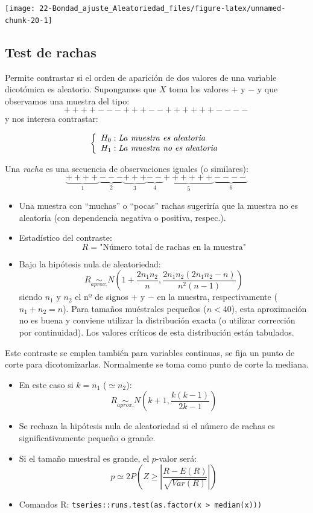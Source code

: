 \documentclass[
]{book}
\theoremstyle{break}
\theoremstyle{definition}
\theoremstyle{definition}
\theoremstyle{definition}
\theoremstyle{remark}
\begin{document}
\begin{center}\texttt{[image: 22-Bondad\_ajuste\_Aleatoriedad\_files/figure-latex/unnamed-chunk-20-1]} \end{center}

\hypertarget{test-de-rachas}{%
\subsection{Test de rachas}\label{test-de-rachas}}

Permite contrastar si el orden de aparición de dos valores de una
variable dicotómica es aleatorio.
Supongamos que \(X\) toma los valores \(+\) y \(-\)
y que observamos una muestra del tipo:
\[++++---+++--++++++----\]
y nos interesa contrastar:

\[\left\{ \begin{array}[c]{l}
    H_{0}:\mathit{La\ muestra\ es\ aleatoria}\\
    H_{1}:\mathit{La\ muestra\ no\ es\ aleatoria}
\end{array}
\right.\]

Una \emph{racha} es una secuencia de observaciones iguales (o
similares):
\[\underbrace{++++}_{1}\underbrace{---}_{2}\underbrace{+++}_{3}
\underbrace{--}_{4}\underbrace{++++++}_{5}\underbrace{----}_{6}\]

\begin{itemize}
\item
  Una muestra con ``muchas'' o ``pocas'' rachas sugeriría que la muestra
  no es aleatoria (con dependencia negativa o positiva, respec.).
\item
  Estadístico del contraste:
  \[R=\text{"Número total de rachas en la muestra"}\]
\item
  Bajo la hipótesis nula de aleatoriedad:
  \[R\underset{aprox.}{\sim}N\left(  1+\frac{2n_{1}n_{2}}{n},
  \frac{2n_{1}n_{2}(2n_{1}n_{2}-n)}{n^{2}(n-1)}\right)\]
  siendo \(n_{1}\) y \(n_{2}\) el nº de signos \(+\) y \(-\) en la muestra,
  respectivamente (\(n_{1}+n_{2}=n\)).
  Para tamaños muéstrales pequeños (\(n<40\)), esta aproximación
  no es buena y conviene utilizar la distribución exacta (o utilizar
  corrección por continuidad). Los valores críticos de esta
  distribución están tabulados.
\end{itemize}

Este contraste se emplea también para variables continuas, se fija
un punto de corte para dicotomizarlas. Normalmente se toma como punto de corte la mediana.

\begin{itemize}
\item
  En este caso si \(k=n_{1}\) (\(\simeq n_{2}\)):
  \[R\underset{aprox.}{\sim}N\left(  k+1,\frac{k(k-1)}{2k-1}\right)\]
\item
  Se rechaza la hipótesis nula de aleatoriedad si el número de rachas
  es significativamente pequeño o grande.
\item
  Si el tamaño muestral es grande, el \(p\)-valor será:
  \[p \simeq 2 P\left( Z \geq \left\vert 
  \frac{R-E(R)}{\sqrt{Var(R)}} \right\vert \right)\]
\item
  Comandos R: \texttt{tseries::runs.test(as.factor(x\ \textgreater{}\ median(x)))}
\end{itemize}
\end{document}
